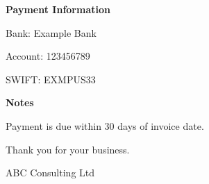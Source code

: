 \documentclass[a4paper,11pt]{article}
\begin{document}
\vspace{1cm}



\textbf{Payment Information}

\vspace{0.2cm}

Bank: Example Bank

Account: 123456789

SWIFT: EXMPUS33


\vspace{1cm}



\textbf{Notes}

Payment is due within 30 days of invoice date.

Thank you for your business.


\vfill


\begin{center}

ABC Consulting Ltd

\end{center}
\end{document}
